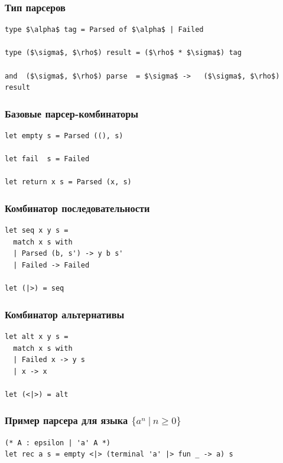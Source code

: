 \documentclass{beamer}
\begin{document}
\begin{frame}[containsverbatim]
  \transwipe[direction=90]
  \frametitle{Тип парсеров}
  
\begin{lstlisting}[frame=single]  
type $\alpha$ tag = Parsed of $\alpha$ | Failed

type ($\sigma$, $\rho$) result = ($\rho$ * $\sigma$) tag

and  ($\sigma$, $\rho$) parse  = $\sigma$ ->   ($\sigma$, $\rho$) result
\end{lstlisting}
\end{frame}


\begin{frame}[fragile]
  \transwipe[direction=90]
  \frametitle{Базовые парсер-комбинаторы}  
\begin{lstlisting}[frame=single]  
let empty s = Parsed ((), s)

let fail  s = Failed 

let return x s = Parsed (x, s)
\end{lstlisting}
\end{frame}

\begin{frame}[fragile]
  \transwipe[direction=90]
  \frametitle{Комбинатор последовательности}  
\begin{lstlisting}[frame=single]  
let seq x y s =
  match x s with
  | Parsed (b, s') -> y b s'
  | Failed -> Failed

let (|>) = seq
\end{lstlisting}
\end{frame}


\begin{frame}[fragile]
  \transwipe[direction=90]
  \frametitle{Комбинатор альтернативы}  
\begin{lstlisting}[frame=single]  
let alt x y s =
  match x s with
  | Failed x -> y s
  | x -> x

let (<|>) = alt
\end{lstlisting}
\end{frame}


\begin{frame}[fragile]
  \transwipe[direction=90]
  \frametitle{Пример парсера для языка $\{ a^n \ | \ n \geq 0 \}$}  
\begin{lstlisting}[frame=single]  
(* A : epsilon | 'a' A *)
let rec a s = empty <|> (terminal 'a' |> fun _ -> a) s
\end{lstlisting}
\end{frame}
\end{document}
